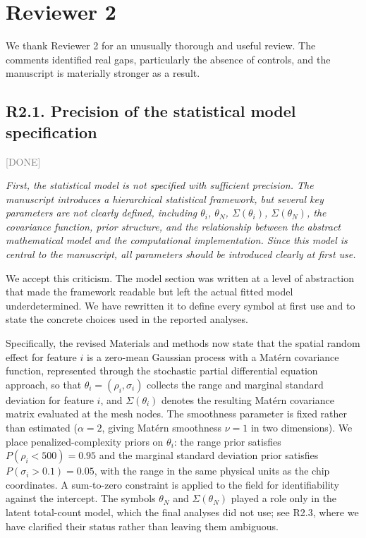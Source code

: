 \documentclass[11pt]{article}
\newcommand{\status}[1]{\textcolor{gray}{\small\textsf{[#1]}}}
\newenvironment{rev}{\begin{leftbar}\itshape\small}{\end{leftbar}}
\begin{document}

\section{Reviewer 2}

\noindent We thank Reviewer 2 for an unusually thorough and useful review. The comments
identified real gaps, particularly the absence of controls, and the manuscript is
materially stronger as a result.

\subsection{R2.1. Precision of the statistical model specification} \status{DONE}

\begin{rev}
First, the statistical model is not specified with sufficient precision. The manuscript
introduces a hierarchical statistical framework, but several key parameters are not
clearly defined, including $\theta_i$, $\theta_N$, $\Sigma(\theta_i)$, $\Sigma(\theta_N)$,
the covariance function, prior structure, and the relationship between the abstract
mathematical model and the computational implementation. Since this model is central to
the manuscript, all parameters should be introduced clearly at first use.
\end{rev}

\noindent We accept this criticism. The model section was written at a level of
abstraction that made the framework readable but left the actual fitted model
underdetermined. We have rewritten it to define every symbol at first use and to state
the concrete choices used in the reported analyses.

Specifically, the revised Materials and methods now state that the spatial random effect
for feature $i$ is a zero-mean Gaussian process with a Mat\'ern covariance function,
represented through the stochastic partial differential equation approach, so that
$\theta_i = (\rho_i, \sigma_i)$ collects the range and marginal standard deviation for
feature $i$, and $\Sigma(\theta_i)$ denotes the resulting Mat\'ern covariance matrix
evaluated at the mesh nodes. The smoothness parameter is fixed rather than estimated
($\alpha = 2$, giving Mat\'ern smoothness $\nu = 1$ in two dimensions). We place
penalized-complexity priors on $\theta_i$: the range prior satisfies
$P(\rho_i < 500) = 0.95$ and the marginal standard deviation prior satisfies
$P(\sigma_i > 0.1) = 0.05$, with the range in the same physical units as the chip
coordinates. A sum-to-zero constraint is applied to the field for identifiability against
the intercept. The symbols $\theta_N$ and $\Sigma(\theta_N)$ played a role only in the
latent total-count model, which the final analyses did not use; see R2.3, where we have
clarified their status rather than leaving them ambiguous.
\end{document}
